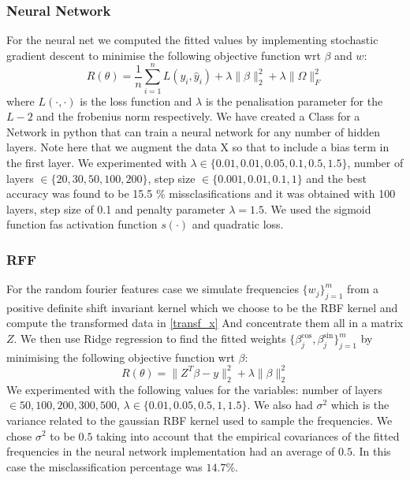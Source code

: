 \documentclass{article} %
\begin{document}
\subsubsection{Neural Network}
For the neural net we computed the fitted values by implementing stochastic gradient descent to minimise the following objective function wrt $\beta$ and $w$:
 $$ R(\theta) = \frac{1}{n} \sum_{i=1}^{n}L(y_{i}, \hat{y}_{i}) + \lambda \| \beta \|^2 _{2} + \lambda \| \Omega \|^2_{F}$$
 where $L(\cdot,\cdot)$ is the loss function and $\lambda$ is the penalisation parameter for the $L-2$ and the frobenius norm respectively. 
 We have created a Class for a Network in python that can train a neural network for any number of hidden layers. Note here that we augment the data X so that to include a bias term in the first layer.
 We experimented with $\lambda \in \{ 0.01, 0.01, 0.05, 0.1, 0.5, 1.5\} $,  number of layers $\in \{ 20, 30, 50,  100, 200\} $, step size $ \in \{ 0.001, 0.01, 0.1, 1\}$ and the best accuracy was found to be 15.5 $\%$ missclasifications and it was obtained with 100 layers, step size of 0.1 and penalty parameter $\lambda = 1.5$. We used the sigmoid function fas activation function $s( \cdot )$ and quadratic loss. 

\subsubsection{RFF}
For the random fourier features case we simulate frequencies
 $ \{ w_{j} \}_{j=1}^{m}$ from a positive definite shift invariant kernel which we choose to be the RBF kernel and compute the transformed 
data in 
\eqref{transf_x} 
And concentrate them all in a matrix $Z$.
We then use Ridge regression to find the fitted weights $\{ \beta_{j}^{\cos}, \beta_{j}^{\sin}\}_{j=1}^{m}$
by minimising the following objective function wrt 
$\beta$:
 $$ R(\theta) = \| Z^{T} \beta - y\|^2_{2} + \lambda \| \beta\|^2 _{2} $$
We experimented with the following values for the variables: number of layers $\in { 50,100,200,300,500}$, $\lambda \in \{ 0.01, 0.05, 0.5, 1, 1.5\}$. We also had  $\sigma^2$ which is the variance related to the gaussian RBF kernel used to sample the frequencies. We chose  $\sigma^2$ to be $0.5$ taking into account that the empirical covariances of the fitted frequencies in the neural network implementation had an average of $0.5.$ In this case the misclassification percentage was $14.7 \%$.
\end{document}
